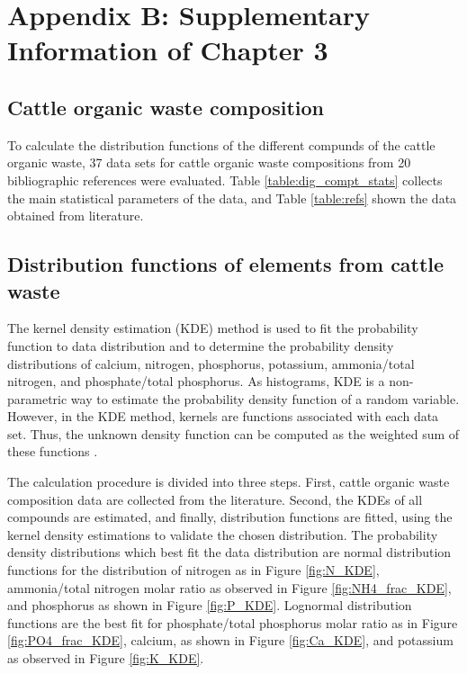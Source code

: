 \chapter{Appendix B: Supplementary Information of Chapter 3}

\begin{refsection}[referencesCh3]
\section{Cattle organic waste composition} \label{ApBcomp_dist}
To calculate the distribution functions of the different compunds of the cattle organic waste, 37 data sets for cattle organic waste compositions from 20 bibliographic references were evaluated. Table \ref{table:dig_compt_stats} collects the main statistical parameters of the data, and Table \ref{table:refs} shown the data obtained from literature.

\section{Distribution functions of elements from cattle waste}

The kernel density estimation (KDE) method is used to fit the probability function to data distribution and to determine the probability density distributions of calcium, nitrogen, phosphorus, potassium, ammonia/total nitrogen, and phosphate/total phosphorus. As histograms, KDE is a non-parametric way to estimate the probability density function of a random variable. However, in the KDE method, kernels are functions associated with each data set. Thus, the unknown density function can be computed as the weighted sum of these functions \citep{Duong}. 

The calculation procedure is divided into three steps. First, cattle organic waste composition data are collected from the literature. Second, the KDEs of all compounds are estimated, and finally, distribution functions are fitted, using the kernel density estimations to validate the chosen distribution. The probability density distributions which best fit the data distribution are normal distribution functions for the distribution of nitrogen as in Figure \ref{fig:N_KDE}, ammonia/total nitrogen molar ratio as observed in Figure \ref{fig:NH4_frac_KDE}, and phosphorus as shown in Figure \ref{fig:P_KDE}. Lognormal distribution functions are the best fit for phosphate/total phosphorus molar ratio as in Figure \ref{fig:PO4_frac_KDE}, calcium, as shown in Figure \ref{fig:Ca_KDE}, and potassium as observed in Figure \ref{fig:K_KDE}.


\end{refsection}
